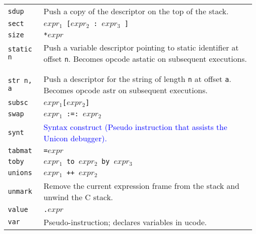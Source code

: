 \begin{xtabular}{l@{\hspace{1.5cm}}p{13.5cm}}
\texttt{sdup}    & Push a copy of the descriptor on the top of the stack.\\

\texttt{sect}    & \texttt{$expr_1$ [$expr_2$ : $expr_3$ ]}\\

\texttt{size}    & \texttt{*$expr$}\\

\texttt{static n} & Push a variable descriptor pointing to static
identifier at offset \texttt{n}. Becomes opcode astatic on subsequent
executions.\\

\\
\\

\texttt{str n, a} & Push a descriptor for the string of length \texttt{n} 
at offset \texttt{a}. Becomes opcode astr on subsequent executions. \\

\texttt{subsc}   & \texttt{$expr_1$[$expr_2$]}\\

\texttt{swap}    & \texttt{$expr_1$ :=: $expr_2$}\\

\texttt{\color{blue}synt}  &  \textcolor{blue}{ Syntax construct (Pseudo instruction
that assists the Unicon debugger).}\\

\texttt{tabmat}  & \texttt{=$expr$}\\

\texttt{toby}    & \texttt{$expr_1$ to $expr_2$ by $expr_3$}\\

\texttt{unions}  & \texttt{$expr_1$ ++ $expr_2$}\\

\texttt{unmark}  & Remove the current expression frame from the stack and
unwind the C stack.\\

\texttt{value}   & \texttt{.$expr$}\\

\texttt{var}     & Pseudo-instruction; declares variables in ucode.\\
\end{xtabular}
